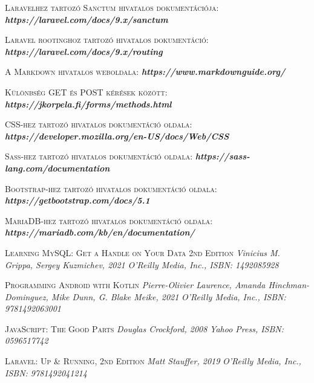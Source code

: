 \documentclass[
]{thesis-ekf}
\theoremstyle{definition}
\theoremstyle{remark}
\begin{document}
\begin{thebibliography}{2}
\textsc{Laravelhez tartozó Sanctum hivatalos dokumentációja:}
\newline
\emph{\bf{https://laravel.com/docs/9.x/sanctum}}

\textsc{Laravel rootinghoz tartozó hivatalos dokumentáció:}
\newline
\emph{\bf{https://laravel.com/docs/9.x/routing}}

\textsc{A Markdown hivatalos weboldala:}
\newline
\emph{\bf{https://www.markdownguide.org/}}

\textsc{Különbség GET és POST kérések között:}
\newline
\emph{\bf{https://jkorpela.fi/forms/methods.html}}

\textsc{CSS-hez tartozó hivatalos dokumentáció oldala:}
\newline
\emph{\bf{https://developer.mozilla.org/en-US/docs/Web/CSS}}

\textsc{Sass-hez tartozó hivatalos dokumentáció oldala:}
\newline
\emph{\bf{https://sass-lang.com/documentation}}

\textsc{Bootstrap-hez tartozó hivatalos dokumentáció oldala:}
\newline
\emph{\bf{https://getbootstrap.com/docs/5.1}}

\textsc{MariaDB-hez tartozó hivatalos dokumentáció oldala:}
\newline
\emph{\bf{https://mariadb.com/kb/en/documentation/}}

\textsc{Learning MySQL: Get a Handle on Your Data 2nd Edition}
\newline
\emph{Vinicius M. Grippa, Sergey Kuzmichev,  2021}
\emph{O'Reilly Media, Inc., ISBN: 1492085928}

\textsc{Programming Android with Kotlin}
\newline
\emph{Pierre-Olivier Laurence, Amanda Hinchman-Dominguez, Mike Dunn, G. Blake Meike,  2021}
\emph{O'Reilly Media, Inc., ISBN: 9781492063001}

\textsc{JavaScript: The Good Parts}
\newline
\emph{Douglas Crockford, 2008}
\emph{Yahoo Press, ISBN: 0596517742}

\textsc{Laravel: Up \& Running, 2nd Edition}
\newline
\emph{Matt Stauffer, 2019}
\emph{O'Reilly Media, Inc., ISBN: 9781492041214}


\end{thebibliography}
\end{document}
